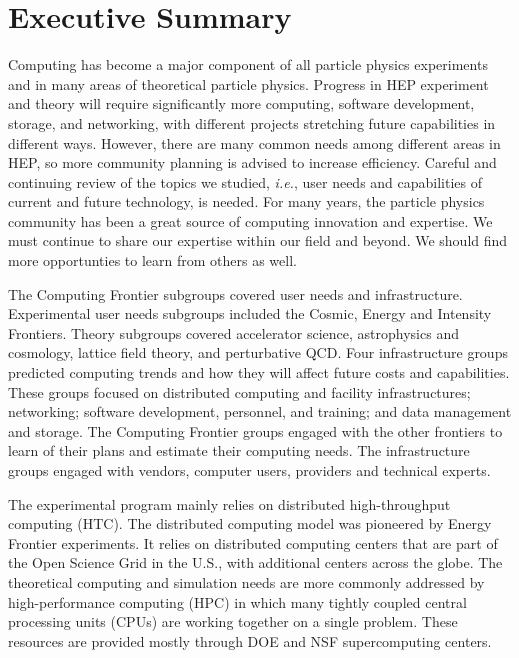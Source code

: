 

\section{Executive Summary}

Computing has become a major component of all particle physics experiments
and in many areas of theoretical particle physics. 
Progress in HEP experiment and theory will require significantly more
computing, software development, storage, and networking, with different
projects stretching future capabilities in different ways.  However, there
are many common needs among different areas in HEP, so more
community planning is advised to increase efficiency.
Careful and continuing review of the topics we studied, 
{\it i.e.}, user needs and capabilities of
current and future technology, is needed.  For many years, the particle physics
community has been a great source of computing innovation and expertise. 
We must continue to share our expertise within our field and beyond.
We should find more opportunties to learn from others as well.

The Computing Frontier
subgroups covered user needs and infrastructure.
Experimental user needs subgroups included the Cosmic, Energy and Intensity Frontiers.
Theory subgroups covered accelerator science,
astrophysics and cosmology, lattice field theory, and perturbative QCD.
Four infrastructure groups predicted computing trends and
how they will affect future costs and
capabilities. These groups focused on distributed computing and facility
infrastructures; networking; software development, personnel, and training; and
data management and storage. 
The Computing
Frontier groups engaged with the other frontiers to learn of
their plans and estimate their computing needs.  The infrastructure groups
engaged with vendors, computer users, providers and technical experts. 

The experimental program mainly relies on distributed
high-throughput computing (HTC). 
The distributed computing model was pioneered by Energy Frontier
experiments.  It relies on distributed computing
centers that are part of the Open Science Grid in the U.S.,
with additional centers across the globe. 
The theoretical computing and simulation needs are more commonly
addressed by high-performance computing (HPC) in which many
tightly coupled central processing units (CPUs) are working together on a single
problem. These resources are provided mostly through DOE and NSF
supercomputing centers.

